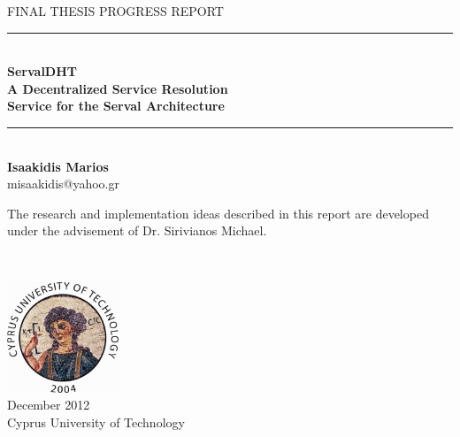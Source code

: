 \begin{titlepage}

\begin{center}

\newcommand{\HRule}{\rule{\linewidth}{0.5mm}}

\textsc{\large FINAL THESIS PROGRESS REPORT}\\[1.5cm]


\HRule \\[0.5cm]
{ \LARGE \bfseries {\huge ServalDHT} \\[0.2cm] A Decentralized Service Resolution\\[0.2cm]Service for the Serval Architecture}\\[0.5cm]

\HRule \\[1cm]

{\LARGE \bf
Isaakidis Marios\\
}
misaakidis@yahoo.gr

\vfill

{\large
The research and implementation ideas described in this report are developed under the advisement of Dr. Sirivianos Michael.}
\end{center}
 ~\\[1.5cm]
\begin{flushright}
\includegraphics[width=0.25\textwidth]{./cut-logo-2}\\ 
{\large
December 2012 \\
Cyprus University of Technology
}
\end{flushright}

\end{titlepage}